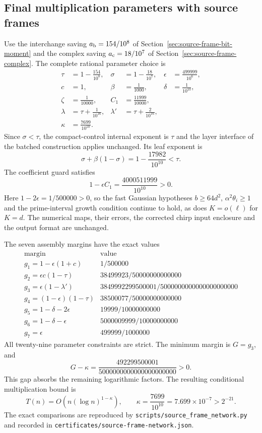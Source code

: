 \subsection{Final multiplication parameters with source frames}
\label{sec:source-frame-assembly}

Use the interchange saving $a_{\rm b}=154/10^8$ of
Section~\ref{sec:source-frame-bit-moment} and the complex saving
$a_{\rm c}=18/10^7$ of Section~\ref{sec:source-frame-complex}. The complete
rational parameter choice is
\[
\begin{aligned}
 \tau&=1-\frac{154}{10^8},&
 \sigma&=1-\frac{18}{10^7},&
 \epsilon&=\frac{499999}{10^6},\\
 c&=1,& \beta&=\frac1{1000},& \delta&=\frac1{10^{10}},\\
 \zeta&=\frac1{10000},& C_1&=\frac{11999}{10000},\\
 \lambda&=\tau+\frac1{10^{16}},&
 \lambda'&=\tau+\frac2{10^{16}},\\
 \kappa&=\frac{7699}{10^{10}}.
\end{aligned}
\]
Since $\sigma<\tau$, the compact-control internal exponent is $\tau$ and
the layer interface of the batched construction applies unchanged. Its leaf
exponent is
\[
 \sigma+\beta(1-\sigma)=1-\frac{17982}{10^{10}}<\tau.
\]
The coefficient guard satisfies
\[
 1-\epsilon C_1=\frac{4000511999}{10^{10}}>0.
\]
Here $1-2\epsilon=1/500000>0$, so the fast Gaussian hypotheses
$b\ge64d^2$, $\alpha^2\theta_i\ge1$ and the prime-interval growth condition
continue to hold, as does $K=o(\ell)$ for $K=d$. The numerical maps,
their errors, the corrected chirp input enclosure and the output format
are unchanged.

The seven assembly margins have the exact values
\[
\begin{array}{c|c}
 \text{margin}&\text{value}\\\hline
 g_1=1-\epsilon(1+c)&1/500000\\
 g_2=\epsilon c(1-\tau)&38499923/50000000000000\\
 g_3=\epsilon(1-\lambda')&3849992299500001/5000000000000000000000\\
 g_4=(1-\epsilon)(1-\tau)&38500077/50000000000000\\
 g_5=1-\delta-2\epsilon&19999/10000000000\\
 g_6=1-\delta-\epsilon&5000009999/10000000000\\
 g_7=\epsilon&499999/1000000
\end{array}
\]
All twenty-nine parameter constraints are strict. The minimum margin is
$G=g_3$, and
\[
 G-\kappa=\frac{492299500001}{5000000000000000000000}>0.
\]
This gap absorbs the remaining logarithmic factors. The resulting
conditional multiplication bound is
\[
 \boxed{
 T(n)=O\!\left(n(\log n)^{1-\kappa}\right),\qquad
 \kappa=\frac{7699}{10^{10}}=7.699\times10^{-7}>2^{-21}.}
\]
The exact comparisons are reproduced by
\texttt{scripts/source\_frame\_network.py} and recorded in
\texttt{certificates/source-frame-network.json}.

